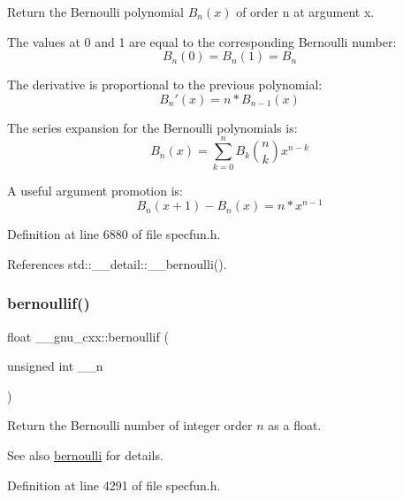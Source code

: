 Return the Bernoulli polynomial $ B_n(x) $ of order n at argument x.

The values at 0 and 1 are equal to the corresponding Bernoulli number\+: \[ B_n(0) = B_n(1) = B_n \]

The derivative is proportional to the previous polynomial\+: \[ B_n'(x) = n * B_{n-1}(x) \]

The series expansion for the Bernoulli polynomials is\+: \[ B_n(x) = \sum_{k=0}^{n} B_k \binom{n}{k} x^{n-k} \]

A useful argument promotion is\+: \[ B_n(x+1) - B_n(x) = n * x^{n-1} \] 

Definition at line 6880 of file specfun.\+h.



References std\+::\+\_\+\+\_\+detail\+::\+\_\+\+\_\+bernoulli().

\mbox{\label{group__gnu__math__spec__func_gabcd77f012ae74989c4bb9ca61978481d}} 
\subsubsection{\texorpdfstring{bernoullif()}{bernoullif()}}
{\footnotesize\ttfamily float \+\_\+\+\_\+gnu\+\_\+cxx\+::bernoullif (\begin{DoxyParamCaption}\item[{unsigned int}]{\+\_\+\+\_\+n }\end{DoxyParamCaption})\hspace{0.3cm}{\ttfamily [inline]}}

Return the Bernoulli number of integer order $ n $ as a {\ttfamily float}.

\begin{DoxySeeAlso}{See also}
\hyperlink{group__gnu__math__spec__func_gad339f0011df1967ec6c9e55bd1547bf4}{bernoulli} for details. 
\end{DoxySeeAlso}


Definition at line 4291 of file specfun.\+h.

\mbox{\label{group__gnu__math__spec__func_gaac8f04abfdd6b744d11cb73ec1f564b1}} 
